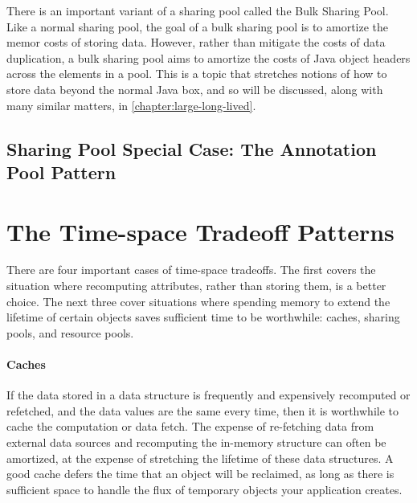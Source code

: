 There is an important variant of a sharing pool called the Bulk Sharing Pool.
Like a normal sharing pool, the goal of a bulk sharing pool is to amortize the
memor costs of storing data. However, rather than mitigate the costs of data
duplication, a bulk sharing pool aims to amortize the costs of Java object
headers across the elements in a pool. This is a topic that stretches notions of
how to store data beyond the normal Java box, and so will be discussed, along
with many similar matters, in \autoref{chapter:large-long-lived}.


\subsection{Sharing Pool Special Case: The Annotation Pool Pattern}

\section{The Time-space Tradeoff Patterns}
There are four important cases of time-space tradeoffs. The first covers
the situation where recomputing attributes, rather than storing them, is a better
choice. The next three cover situations where spending memory to extend the
lifetime of certain objects saves sufficient time to be worthwhile: caches,
sharing pools, and resource pools.

\paragraph{Caches}

If the data stored in a data structure is frequently and expensively recomputed
or refetched, and the data values are the same every time, then it is worthwhile
to cache the computation or data fetch. The expense of re-fetching data from
external data sources and recomputing the in-memory structure can often be
amortized, at the expense of stretching the lifetime of these data structures. A
good cache defers the time that an object will be reclaimed, as long as there is
sufficient space to handle the flux of temporary objects your application
creates.





